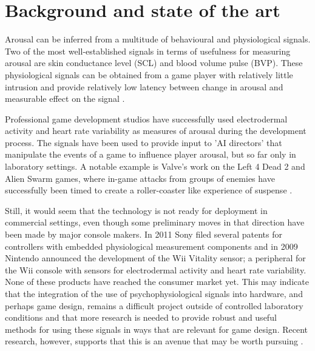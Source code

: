 \documentclass{llncs}
\begin{document}
\section{Background and state of the art}
Arousal can be inferred from a multitude of behavioural and physiological signals.%
Two of the most well-established signals in terms of usefulness for measuring arousal are skin conductance level (SCL) and blood volume pulse (BVP).
These physiological signals can be obtained from a game player with relatively little intrusion and provide relatively low latency between change in arousal and measurable effect on the signal \cite{picard1997affective,boucsein2011electrodermal}.

Professional game development studios have successfully used electrodermal activity and heart rate variability as measures of arousal during the development process. The signals have been used to provide input to 'AI directors' that manipulate the events of a game to influence player arousal, but so far only in laboratory settings.
A notable example is Valve's work on the Left 4 Dead 2 and Alien Swarm games, where in-game attacks from groups of enemies have successfully been timed to create a roller-coaster like experience of suspense \cite{ambinder2011}.

Still, it would seem that the technology is not ready for deployment in commercial settings, even though some preliminary moves in that direction have been made by major console makers. In 2011 Sony filed several patents for controllers with embedded physiological measurement components\cite{sonypatent} and in 2009 Nintendo announced the development of the Wii Vitality sensor; a peripheral for the Wii console with sensors for electrodermal activity and heart rate variability\cite{wiivitality}. None of these products have reached the consumer market yet. This may indicate that the integration of the use of psychophysiological signals into hardware, and perhaps game design, remains a difficult project outside of controlled laboratory conditions and that more research is needed to provide robust and useful methods for using these signals in ways that are relevant for game design. Recent research, however, supports that this is an avenue that may be worth pursuing \cite{perez2011generic}.

\end{document}
